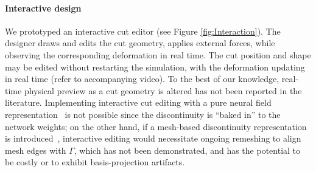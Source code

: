 \paragraph{Interactive design}
We prototyped an interactive cut editor (see Figure \ref{fig:Interaction}). The designer draws and edits the cut geometry, applies external forces, while observing the corresponding deformation in real time. The cut position and shape may be edited without restarting the simulation, with the deformation updating in real time (refer to accompanying video). To the best of our knowledge, real-time physical preview as a cut geometry is altered has not been reported in the literature. Implementing interactive cut editing with a pure neural field representation~\cite{chang:2023:licrom} is not possible since the discontinuity is ``baked in'' to the network weights; on the other hand, if a mesh-based discontinuity representation is introduced~\cite{Belhe:2023:DiscontinuityAwareNeuralFields}, interactive editing would necessitate ongoing remeshing to align mesh edges with $\Gamma$, which has not been demonstrated, and has the potential to be costly or to exhibit basis-projection artifacts.





